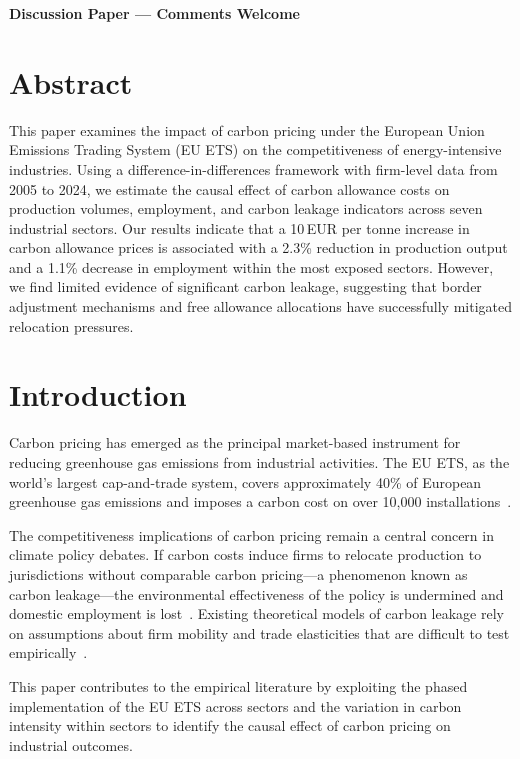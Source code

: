\documentclass[
    language=english,
    doctype=article,
    institution=none,
    titlestyle=book,
]{../../omnilatex}
\begin{document}
\maketitle

\begin{center}
    \textbf{Discussion Paper --- Comments Welcome}
\end{center}

\section*{Abstract}
This paper examines the impact of carbon pricing under the European Union
Emissions Trading System (EU ETS) on the competitiveness of energy-intensive
industries.  Using a difference-in-differences framework with firm-level data
from 2005 to 2024, we estimate the causal effect of carbon allowance costs on
production volumes, employment, and carbon leakage indicators across seven
industrial sectors.  Our results indicate that a 10\,EUR per tonne increase in
carbon allowance prices is associated with a 2.3\% reduction in production
output and a 1.1\% decrease in employment within the most exposed sectors.
However, we find limited evidence of significant carbon leakage, suggesting
that border adjustment mechanisms and free allowance allocations have
successfully mitigated relocation pressures.

\section{Introduction}
Carbon pricing has emerged as the principal market-based instrument for
reducing greenhouse gas emissions from industrial activities.  The EU ETS,
as the world's largest cap-and-trade system, covers approximately 40\% of
European greenhouse gas emissions and imposes a carbon cost on over 10,000
installations~\cite{bibid}.

The competitiveness implications of carbon pricing remain a central concern in
climate policy debates.  If carbon costs induce firms to relocate production to
jurisdictions without comparable carbon pricing---a phenomenon known as carbon
leakage---the environmental effectiveness of the policy is undermined and
domestic employment is lost~\cite{einstein1905}.  Existing theoretical models
of carbon leakage rely on assumptions about firm mobility and trade elasticities
that are difficult to test empirically~\cite{goossensLaTeXCompanion1993}.

This paper contributes to the empirical literature by exploiting the phased
implementation of the EU ETS across sectors and the variation in carbon
intensity within sectors to identify the causal effect of carbon pricing on
industrial outcomes.
\end{document}
